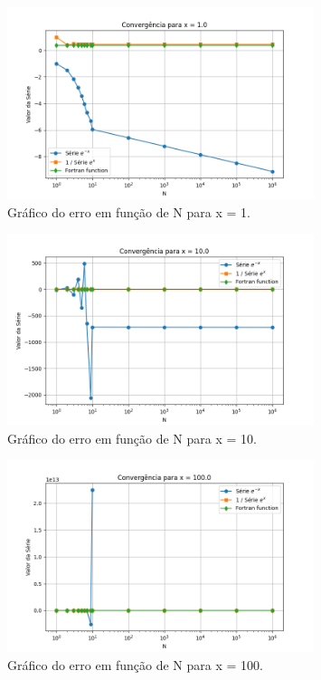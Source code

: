 \documentclass[12pt, a4paper]{article} %
\begin{document}
\begin{figure}[H]
    \centering
    \includegraphics[width=0.8\textwidth]{../images/grafico_x_1.0.png}
    \caption{Gr\'afico do erro em fun\c{c}\~ao de N para x = 1.}
\end{figure}

\begin{figure}[H]
    \centering
    \includegraphics[width=0.8\textwidth]{../images/grafico_x_10.0.png}
    \caption{Gr\'afico do erro em fun\c{c}\~ao de N para x = 10.}
\end{figure}

\begin{figure}[H]
    \centering
    \includegraphics[width=0.8\textwidth]{../images/grafico_x_100.0.png}
    \caption{Gr\'afico do erro em fun\c{c}\~ao de N para x = 100.}
\end{figure}
\end{document}
